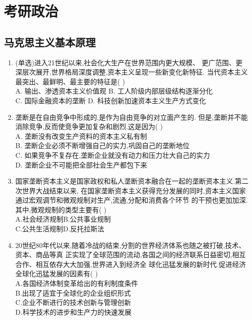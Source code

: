 \documentclass[12pt, a4paper, oneside, UTF8]{ctexbook}
\begin{document}
% 
\else
\fi
\chapter{考研政治}
\section{马克思主义基本原理}
\begin{enumerate}
    \item (单选)进入21世纪以来,社会化大生产在世界范围内更大规模、
    更广范围、更深层次展开,世界格局深度调整,资本主义呈现一些新变化新特征.
    当代资本主义最突出、最鲜明、最主要的特征是(   ) \\
    A. 输出、渗透资本主义价值观 \qquad
    B. 工人阶级内部层级结构逐渐分化 \\
    C. 国际金融资本的垄断 \qquad\qquad\quad
    D. 科技创新加速资本主义生产方式变化

    \item 垄断是在自由竞争中形成的,是作为自由竞争的对立面产生的.
    但是,垄断并不能消除竞争,反而使竞争更加复杂和剧烈.这是因为(   ) \\
    A. 垄断没有改变生产资料的资本主义私有制 \\
    B. 垄断企业必须不断增强自己的实力,巩固自己的垄断地位\\
    C. 如果竞争不复存在,垄断企业就没有动力和压力壮大自己的实力\\
    D. 垄断企业不可能把全部社会生产都包下来

    \item 国家垄断资本主义是国家政权和私人垄断资本融合在一起的垄断资本主义.第二次世界大战结束以来,
    在国家垄断资本主义获得充分发展的同时,资本主义国家通过宏观调节和微观规制对生产,流通,分配和消费各个环节
    的干预也更加加深.其中,微观规制的类型主要有(   ) \\
    A.社会经济规制\qquad B.公共事业规制 \\
    C.公共生活规制\qquad D.反托拉斯法 

    \item 20世纪80年代以来,随着冷战的结束,分割的世界经济体系也随之被打破,技术、资本、商品等真
    正实现了全球范围的流动,各国之间的经济联系日益密切,相互合作、相互依存大大加强,世界进入到经济全
    球化迅猛发展的新时代.促进经济全球化迅猛发展的因素有(   ) \\
    A.各国经济体制变革给出的有利制度条件 \\
    B.出现了适宜于全球化的企业组织形式 \\
    C.企业不断进行的技术创新与管理创新 \\
    D.科学技术的进步和生产力的快速发展


\end{enumerate}
\end{document}
